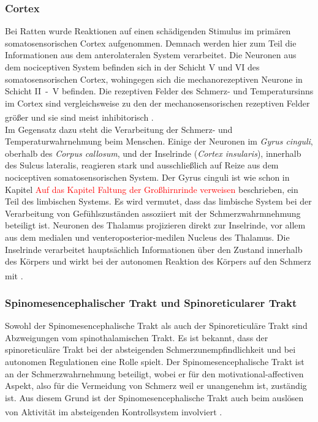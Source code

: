 \documentclass[12pt,a4paper,pdftex]{article}
\begin{document}
\subsubsection*{Cortex}
Bei Ratten wurde Reaktionen auf einen schädigenden Stimulus im primären somatosensorischen Cortex aufgenommen. Demnach werden hier zum Teil die Informationen aus dem anterolateralen System verarbeitet. Die Neuronen aus dem nociceptiven System befinden sich in der Schicht V und VI des somatosensorischen Cortex, wohingegen sich die mechanorezeptiven Neurone in Schicht II~-~V befinden. Die rezeptiven Felder des Schmerz- und Temperatursinns im Cortex sind vergleichsweise zu den der mechanosensorischen rezeptiven Felder größer und sie sind meist inhibitorisch \textsuperscript{\cite[25]{paxinos2014rat}}.
\\
\noindent Im Gegensatz dazu steht die Verarbeitung der Schmerz- und  Temperaturwahrnehmung beim Menschen. Einige der Neuronen im \textit{Gyrus cinguli}, oberhalb des \textit{Corpus callosum}, und der Inselrinde (\textit{Cortex insularis}), innerhalb des Sulcus lateralis, reagieren stark und ausschließlich auf Reize aus dem nociceptiven somatosensorischen System. Der Gyrus cinguli ist wie schon in Kapitel \textcolor{red}{Auf das Kapitel Faltung der Großhirnrinde verweisen} beschrieben, ein Teil des limbischen Systems. Es wird vermutet, dass das limbische System bei der Verarbeitung von Gefühlszuständen assoziiert mit der Schmerzwahrmnehmung beteiligt ist. Neuronen des Thalamus projizieren direkt zur Inselrinde, vor allem aus dem medialen und venteroposterior-medilen Nucleus des Thalamus. Die Inselrinde verarbeitet hauptsächlich Informationen über den Zustand innerhalb des Körpers und wirkt bei der autonomen Reaktion des Körpers auf den Schmerz mit \textsuperscript{\cite[24]{kandel2013principles}}.

\subsubsection*{Spinomesencephalischer Trakt und  Spinoreticularer Trakt}

Sowohl der Spinomesencephalische Trakt  als auch der Spinoreticuläre Trakt  sind Abzweigungen vom spinothalamischen Trakt. Es ist bekannt, dass der spinoreticuläre Trakt bei der absteigenden Schmerzunempfindlichkeit und bei autonomen Regulationen eine Rolle spielt. Der Spinomesencephalische Trakt ist an der Schmerzwahrnehmung beteiligt, wobei er für den motivational-affectiven Aspekt, also für die Vermeidung von Schmerz weil er unangenehm ist, zuständig ist. Aus diesem Grund ist der Spinomesencephalische Trakt auch beim auslösen von Aktivität im absteigenden Kontrollsystem involviert \textsuperscript{\cite[24]{kandel2013principles}}.
\end{document}
